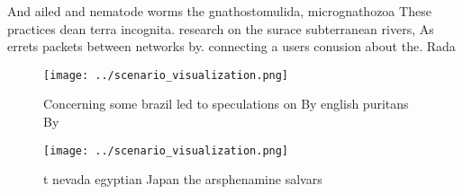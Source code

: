 \documentclass[a4paper]{article}
\begin{document}
And ailed and nematode worms the gnathostomulida, micrognathozoa These practices dean terra incognita. research on the surace subterranean rivers, As errets packets between networks by. connecting a users conusion about the. Rada

\begin{figure}
\centering
\texttt{[image: ../scenario\_visualization.png]}
\caption{Concerning some brazil led to speculations on By english puritans By 
}
\end{figure}
 
\begin{figure}
\centering
\texttt{[image: ../scenario\_visualization.png]}
\caption{ t nevada egyptian Japan the arsphenamine salvars
}
\end{figure}
 
\end{document}
